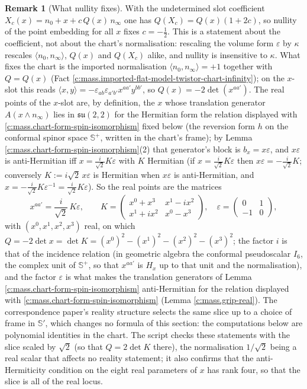 \documentclass[11pt]{article}
\theoremstyle{definition}
\newtheorem{remark}[theorem]{Remark}
\theoremstyle{plain}
\newcommand{\changedmark}[2]{\marginpar{\raggedright\scriptsize\color{#1}#2}}
\providecommand{\CS}{}\renewcommand{\CS}{{\mathbb{S}^{+}}}
\providecommand{\Sc}{}\renewcommand{\Sc}{\mathbb{S}}
\providecommand{\ip}{}\renewcommand{\ip}[2]{\langle #1, #2\rangle}
\begin{document}
\begin{remark}[What nullity fixes]\label{c:note.mass.what-nullity-fixes}
\changedmark{gray}{reworded}
With the undetermined slot coefficient $X_{c}(x) = n_{0} + x + c\,Q(x)\,n_{\infty}$ one has $Q(X_{c}) = Q(x)(1 + 2c)$, so nullity of the point embedding for all $x$ fixes $c = -\tfrac12$. This is a statement about the coefficient, not about the chart's normalisation: rescaling the volume form $\varepsilon$ by $\kappa$ rescales $\ip{n_{0}}{n_{\infty}}$, $Q(x)$ and $Q(X_{c})$ alike, and nullity is insensitive to $\kappa$. What fixes the chart is the imported normalisation $\ip{n_{0}}{n_{\infty}} = +1$ together with $Q = Q(x)$ (Fact \ref{c:mass.imported-flat-model-twistor-chart-infinity}); on the $x$-slot this reads $\ip{x}{y} = -\varepsilon_{ab}\varepsilon_{a'b'}x^{aa'}y^{bb'}$, so $Q(x) = -2\det(x^{aa'})$. The real points of the $x$-slot are, by definition, the $x$ whose translation generator $A(x\wedge n_{\infty})$ lies in $\mathfrak{su}(2,2)$ for the Hermitian form the relation displayed with \ref{c:mass.chart-form-spin-isomorphism} fixed below (the reversion form $h$ on the conformal spinor space $\CS$, written in the chart's frame); by Lemma \ref{c:mass.chart-form-spin-isomorphism}(2) that generator's block is $b_{x} = x\varepsilon$, and $x\varepsilon$ is anti-Hermitian iff $x = \tfrac{i}{\sqrt2}K\varepsilon$ with $K$ Hermitian (if $x = \tfrac{i}{\sqrt2}K\varepsilon$ then $x\varepsilon = -\tfrac{i}{\sqrt2}K$; conversely $K := i\sqrt2\,x\varepsilon$ is Hermitian when $x\varepsilon$ is anti-Hermitian, and $x = -\tfrac{i}{\sqrt2}K\varepsilon^{-1} = \tfrac{i}{\sqrt2}K\varepsilon$). So the real points are the matrices
\begin{equation}
x^{aa'} = \frac{i}{\sqrt2}\,K\varepsilon, \qquad K = \begin{pmatrix} x^{0}+x^{3} & x^{1}-ix^{2} \\ x^{1}+ix^{2} & x^{0}-x^{3}\end{pmatrix},\quad \varepsilon = \begin{pmatrix} 0 & 1 \\ -1 & 0\end{pmatrix},
\end{equation}
with $(x^{0}, x^{1}, x^{2}, x^{3})$ real, on which $Q = -2\det x = \det K = (x^{0})^{2} - (x^{1})^{2} - (x^{2})^{2} - (x^{3})^{2}$; the factor $i$ is that of the incidence relation (in geometric algebra the conformal pseudoscalar $I_6$, the complex unit of $\CS$, so that $x^{aa'}$ is $H_x$ up to that unit and the normalisation), and the factor $\varepsilon$ is what makes the translation generators of Lemma \ref{c:mass.chart-form-spin-isomorphism} anti-Hermitian for the relation displayed with \ref{c:mass.chart-form-spin-isomorphism} (Lemma \ref{c:mass.grip-real}). The correspondence paper's reality structure \cite[Prop.~4.5]{ButlerT9} selects the same slice up to a choice of frame in $\Sc'$, which changes no formula of this section: the computations below are polynomial identities in the chart. The script checks these statements with the slice scaled by $\sqrt2$ (so that $Q = 2\det K$ there), the normalisation $1/\sqrt2$ being a real scalar that affects no reality statement; it also confirms that the anti-Hermiticity condition on the eight real parameters of $x$ has rank four, so that the slice is all of the real locus.

\end{remark}
\end{document}
